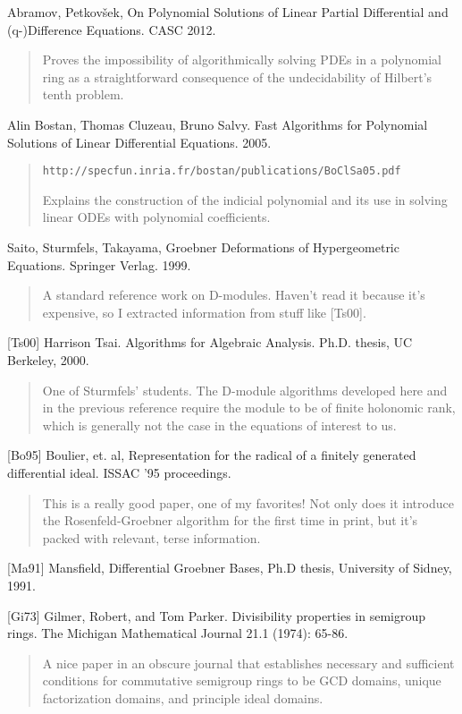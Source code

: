 \documentclass{article}
\begin{document}
Abramov, Petkov\v sek,
On Polynomial Solutions of Linear Partial
Differential and (q-)Difference Equations.  CASC 2012.

\begin{quote}
Proves the impossibility of algorithmically solving PDEs in a polynomial
ring as a straightforward consequence of the undecidability
of Hilbert's tenth problem.
\end{quote}

Alin Bostan, Thomas Cluzeau, Bruno Salvy.
Fast Algorithms for Polynomial Solutions
of Linear Differential Equations. 2005.

\begin{quote}
{\tt http://specfun.inria.fr/bostan/publications/BoClSa05.pdf}

Explains the construction of the indicial polynomial and its
use in solving linear ODEs with polynomial coefficients.
\end{quote}

Saito, Sturmfels, Takayama, Groebner Deformations of Hypergeometric Equations.
Springer Verlag. 1999.

\begin{quote}
A standard reference work on D-modules.  Haven't read it because it's
expensive, so I extracted information from stuff like [Ts00].
\end{quote}

[Ts00] Harrison Tsai.  Algorithms for Algebraic Analysis.  Ph.D. thesis, UC Berkeley, 2000.

\begin{quote}
One of Sturmfels' students.  The D-module algorithms developed here
and in the previous reference require the module to be of finite
holonomic rank, which is generally not the case in the equations
of interest to us.
\end{quote}

[Bo95] Boulier, et. al, Representation for the radical of a finitely
generated differential ideal.  ISSAC '95 proceedings.

\begin{quote}
This is a really good paper, one of my favorites!  Not only does it
introduce the Rosenfeld-Groebner algorithm for the first time in
print, but it's packed with relevant, terse information.
\end{quote}

[Ma91] Mansfield, Differential Groebner Bases, Ph.D thesis, University
of Sidney, 1991.

[Gi73] Gilmer, Robert, and Tom Parker.  Divisibility properties in semigroup rings.
The Michigan Mathematical Journal 21.1 (1974): 65-86.

\begin{quote}
  A nice paper in an obscure journal that establishes necessary and
  sufficient conditions for commutative semigroup rings to be GCD
  domains, unique factorization domains, and principle ideal domains.
\end{quote}
\end{document}
